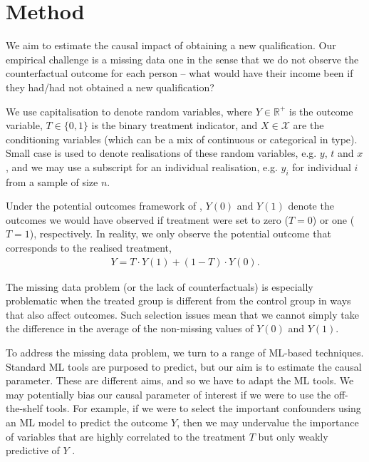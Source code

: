 \documentclass[12pt, a4paper]{article}
\begin{document}



\section{Method}

We aim to estimate the causal impact of obtaining a new qualification. Our empirical challenge is a missing data one in the sense that we do not observe the counterfactual outcome for each person -- what would have their income been if they had/had not obtained a new qualification?

We use capitalisation to denote random variables, where $Y \in \mathbb{R}^+$ is
the outcome variable, $T \in \{0, 1\}$ is the binary treatment indicator, and
$X \in \mathcal{X}$ are the conditioning variables (which can be a mix of
continuous or categorical in type). Small case is used to denote realisations
of these random variables, e.g. $y$, $t$ and $x$, and we may use a subscript
for an individual realisation, e.g. $y_i$ for individual $i$ from a sample of
size $n$.

Under the potential outcomes framework of \cite{imbens2015}, $Y(0)$ and $Y(1)$ denote the outcomes we would have observed if treatment were set to zero ($T=0$) or one ($T=1$), respectively. In reality, we only observe the potential outcome that corresponds to the realised treatment,
\begin{align}
Y = T \cdot Y(1) + (1-T) \cdot Y(0).
\end{align}

The missing data problem (or the lack of counterfactuals) is especially problematic when the treated group is different from the control group in ways that also affect outcomes. Such selection issues mean that we cannot simply take the difference in the average of the non-missing values of $Y(0)$ and $Y(1)$.

To address the missing data problem, we turn to a range of ML-based techniques.
Standard ML tools are purposed to predict, but our aim is to estimate the
causal parameter. These are different aims, and so we have to adapt the ML
tools. We may potentially bias our causal parameter of interest if we were to
use the off-the-shelf tools. For example, if we were to select the important
confounders using an ML model to predict the outcome $Y$, then we may
undervalue the importance of variables that are highly correlated to the
treatment $T$ but only weakly predictive of $Y$ \citep{cherno2018}.
\end{document}
